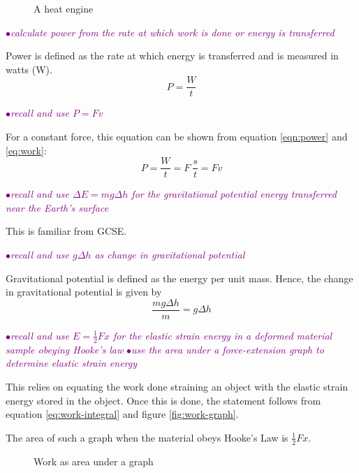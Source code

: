 \documentclass[a4paper,11pt,twoside]{memoir}
\newcounter{spec}[chapter]
\newcommand{\spec}[1]{\Needspace{5\baselineskip}\textcolor{purple}{$\bullet$\hspace{0.5cm}\textit{#1}}}
\begin{document}
\begin{figure}[h]
  \begin{center}
  \end{center}
  \caption{A heat engine}
  \label{fig:heat}
\end{figure}

\spec{calculate power from the rate at which work is done or energy is transferred}

Power is defined as the rate at which energy is transferred and is measured in watts (\si{\watt}).
\begin{equation}\label{eqn:power}
  P = \frac{W}{t}
\end{equation}

\spec{recall and use $P = Fv$}

For a constant force, this equation can be shown from equation \ref{eqn:power} and \ref{eq:work}:
\[ P = \frac{W}{t} = F\ \frac{s}{t} = Fv \]

\spec{recall and use $\Delta E = mg\Delta h$ for the gravitational potential energy transferred near the Earth's surface}

This is familiar from GCSE.

\spec{recall and use $g\Delta h$ as change in gravitational potential}

Gravitational potential is defined as the energy per unit mass. Hence, the change in gravitational potential is given by \[\frac{mg\Delta h}{m} = g\Delta h\]

\spec{recall and use $E = \frac{1}{2}Fx$ for the elastic strain energy in a deformed material sample obeying Hooke's law}
\spec{use the area under a force-extension graph to determine elastic strain energy}

This relies on equating the work done straining an object with the elastic strain energy stored in the object. Once this is done, the statement follows from equation \ref{eq:work-integral} and figure \ref{fig:work-graph}.

The area of such a graph when the material obeys Hooke's Law is $\frac{1}{2}Fx$.

\begin{figure}[h]
  \begin{center}
  \end{center}
  \caption{Work as area under a graph}
  \label{fig:hooke's law}
\end{figure}
\end{document}
